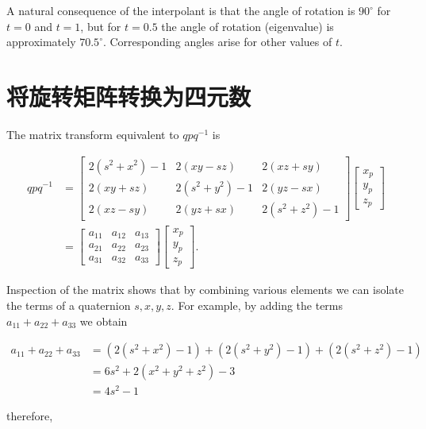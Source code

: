 A natural consequence of the interpolant is that the angle of rotation is $90^{\circ}$ for $t=0$ and $t=1$, but for $t=0.5$ the angle of rotation (eigenvalue) is approximately $70.5^{\circ}$. Corresponding angles arise for other values of $t$.

\section{将旋转矩阵转换为四元数}
The matrix transform equivalent to $q p q^{-1}$ is

$$
\begin{aligned}
q p q^{-1} & =\left[\begin{array}{ccc}
2\left(s^{2}+x^{2}\right)-1 & 2(x y-s z) & 2(x z+s y) \\
2(x y+s z) & 2\left(s^{2}+y^{2}\right)-1 & 2(y z-s x) \\
2(x z-s y) & 2(y z+s x) & 2\left(s^{2}+z^{2}\right)-1
\end{array}\right]\left[\begin{array}{l}
x_{p} \\
y_{p} \\
z_{p}
\end{array}\right] \\
& =\left[\begin{array}{lll}
a_{11} & a_{12} & a_{13} \\
a_{21} & a_{22} & a_{23} \\
a_{31} & a_{32} & a_{33}
\end{array}\right]\left[\begin{array}{l}
x_{p} \\
y_{p} \\
z_{p}
\end{array}\right] .
\end{aligned}
$$

Inspection of the matrix shows that by combining various elements we can isolate the terms of a quaternion $s, x, y, z$. For example, by adding the terms $a_{11}+a_{22}+a_{33}$ we obtain

$$
\begin{aligned}
a_{11}+a_{22}+a_{33} & =\left(2\left(s^{2}+x^{2}\right)-1\right)+\left(2\left(s^{2}+y^{2}\right)-1\right)+\left(2\left(s^{2}+z^{2}\right)-1\right) \\
& =6 s^{2}+2\left(x^{2}+y^{2}+z^{2}\right)-3 \\
& =4 s^{2}-1
\end{aligned}
$$

therefore,

